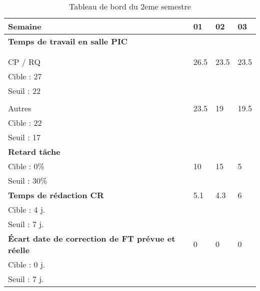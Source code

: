 \documentclass[asi,sansVersion]{picInsa}
\begin{document}
	\newpage
	\begin{landscape}
	\begin{center}
		\LARGE
		\textsc{
			\TB{}\\
		}
	\end{center}
	\vspace{0.5cm}


		\begin{longtable}{|p{2.2cm}|p{1cm}|p{1cm}|p{1cm}|}
		\caption{Tableau de bord du 2eme semestre}\\\hline
			\hline
			\rowcolor[gray]{0.85}
			Semaine & 01 & 02 & 03\\\hline
			\footnotesize
			\textbf{Temps de travail en salle PIC} & & &\\ 
			& & &\\
			& & &\\
			CP / RQ & 26.5 & 23.5 & 23.5 \\
			Cible : 27 & & & \\
			Seuil : 22 & & & \\
			& & & \\
			Autres  & 23.5 & 19 & 19.5 \\
			Cible : 22  & & & \\
			Seuil : 17 & & & \\\hline
			\footnotesize
			\textbf{Retard tâche} & & & \\
			Cible : 0\% & 10 & 15 & 5\\
			Seuil : 30\% & & & \\\hline
			\textbf{Temps de rédaction CR} & 5.1 & 4.3 & 6\\
			Cible : 4 j. & & & \\
			Seuil : 7 j. & & & \\\hline
			\footnotesize
			\textbf{Écart date de correction de FT prévue et réelle} & 0 & 0 & 0\\
			Cible : 0 j. & & & \\
			Seuil : 7 j. & & & \\\hline
			
		\end{longtable}
	\end{landscape}
\end{document}
